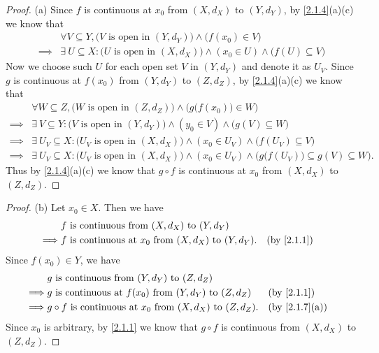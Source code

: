 \begin{proof}{(a)}
  Since \(f\) is continuous at \(x_0\) from \((X, d_X)\) to \((Y, d_Y)\), by \cref{2.1.4}(a)(c) we know that
  \begin{align*}
             & \forall V \subseteq Y, \big(V \text{ is open in } (Y, d_Y)\big) \land \big(f(x_0) \in V\big)                         \\
    \implies & \exists\ U \subseteq X : \big(U \text{ is open in } (X, d_X)\big) \land (x_0 \in U) \land \big(f(U) \subseteq V\big)
  \end{align*}
  Now we choose such \(U\) for each open set \(V\) in \((Y, d_Y)\) and denote it as \(U_V\).
  Since \(g\) is continuous at \(f(x_0)\) from \((Y, d_Y)\) to \((Z, d_Z)\), by \cref{2.1.4}(a)(c) we know that
  \begin{align*}
             & \forall W \subseteq Z, \big(W \text{ is open in } (Z, d_Z)\big) \land \Big(g\big(f(x_0)\big) \in W\Big)                                                 \\
    \implies & \exists\ V \subseteq Y : \big(V \text{ is open in } (Y, d_Y)\big) \land (y_0 \in V) \land \big(g(V) \subseteq W\big)                                    \\
    \implies & \exists\ U_V \subseteq X : \big(U_V \text{ is open in } (X, d_X)\big) \land (x_0 \in U_V) \land \big(f(U_V) \subseteq V\big)                            \\
    \implies & \exists\ U_V \subseteq X : \big(U_V \text{ is open in } (X, d_X)\big) \land (x_0 \in U_V) \land \Big(g\big(f(U_V)\big) \subseteq g(V) \subseteq W\Big).
  \end{align*}
  Thus by \cref{2.1.4}(a)(c) we know that \(g \circ f\) is continuous at \(x_0\) from \((X, d_X)\) to \((Z, d_Z)\).
\end{proof}

\begin{proof}{(b)}
  Let \(x_0 \in X\).
  Then we have
  \begin{align*}
             & f \text{ is continuous from } (X, d_X) \text{ to } (Y, d_Y)                                  \\
    \implies & f \text{ is continuous at } x_0 \text{ from } (X, d_X) \text{ to } (Y, d_Y). &  & \by{2.1.1}
  \end{align*}
  Since \(f(x_0) \in Y\), we have
  \begin{align*}
             & g \text{ is continuous from } (Y, d_Y) \text{ to } (Z, d_Z)                                                           \\
    \implies & g \text{ is continuous at } f(x_0) \text{ from } (Y, d_Y) \text{ to } (Z, d_Z)       &  & \by{2.1.1}                  \\
    \implies & g \circ f \text{ is continuous at } x_0 \text{ from } (X, d_X) \text{ to } (Z, d_Z). &  & \text{(by \cref{2.1.7}(a))}
  \end{align*}
  Since \(x_0\) is arbitrary, by \cref{2.1.1} we know that \(g \circ f\) is continuous from \((X, d_X)\) to \((Z, d_Z)\).
\end{proof}

